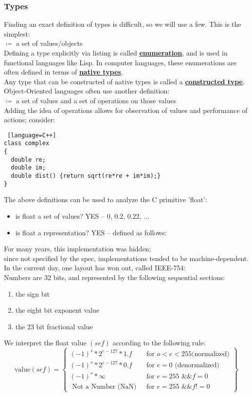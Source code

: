 \documentclass[../../lecture_notes.tex]{subfiles}
\begin{document}
\subsubsection*{Types}
Finding an exact definition of types is difficult, so we will use a few.  This is the simplest:\\
\indent $\coloneqq$ a set of values/objects\\
Defining a type explicitly via listing is called \textbf{\underline{enumeration}},
	and is used in functional languages like Lisp.
In computer languages, these enumerations are often defined in terms of \textbf{\underline{native types}}.\\
Any type that can be constructed of native types is called a \textbf{\underline{constructed type}}.
\\
Object-Oriented languages often use another definition:\\
\indent $\coloneqq$ a set of values and a set of operations on those values\\
Adding the idea of operations allows for observation of values and performance of actions; consider:
\begin{lstlisting} [language=C++]
class complex 
{
  double re;
  double im;
  double dist() {return sqrt(re*re + im*im);}
}
\end{lstlisting}
The above definitions can be used to analyze the C primitive 'float':
\begin{itemize} [itemsep=0mm]
	\item is float a set of values? YES -- {0, 0.2, 0.22, ...}
	\item is float a representation? YES -- defined as follows:
\end{itemize} 
For many years, this implementation was hidden;\\
	since not specified by the spec, implementations tended to be machine-dependent.\\
In the current day, one layout has won out, called IEEE-754:\\
\indent Numbers are 32 bits, and represented by the following sequential sections:
	\begin{enumerate} [itemsep=0mm]
		\item the sign bit
		\item the eight bit exponent value
		\item the 23 bit fractional value
	\end{enumerate}
We interpret the float value $(sef)$ according to the following rule:
	\begin{equation*}
		\text{value}(sef) = \left\{ \begin{array} {lr}
				(-1)^s * 2^{e - 127} * 1.f & \text{ for } o < e < 255 \text{(normalized)}\\
				(-1)^s * 2^{e - 127} * 0.f & \text{ for } e = 0 \text{ (denormalized)}\\
				(-1)^s * \infty & \text{ for } e=255 \text{ \&\& } f = 0\\
				\text{ Not a Number (NaN) } & \text{ for } e = 255 \text{ \&\& } f != 0
			\end{array} \right\}
	\end{equation*}
\end{document}
